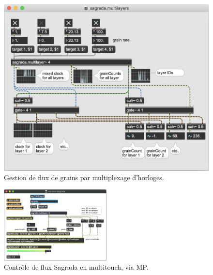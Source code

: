 \begin{figure}[!htbp]
	\captionsetup{format=plain}
	\includegraphics[width=\textwidth]{gfx/04_algorithms/Sagrada-multilayers.png}
	\caption[Sagrada : gestion de flux de grains]{Gestion de flux de grains par multiplexage d'horloges.}
	\label{fig:algorithms:MP-multilayers}
\end{figure}

\begin{figure}[!htbp]
	\captionsetup{format=plain}
	\includegraphics[width=0.5\textwidth]{gfx/04_algorithms/mp-and-sagrada.png}
	\caption[Contrôle de flux Sagrada avec MP]{Contrôle de flux Sagrada en multitouch, via MP.}
	\label{fig:algorithms:MP-and-Sagrada}
\end{figure}



